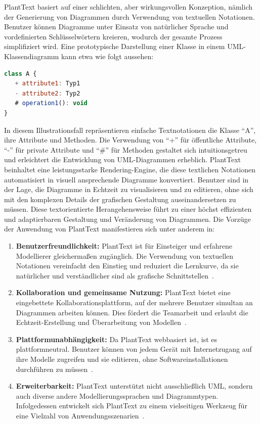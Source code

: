 PlantText basiert auf einer schlichten, aber wirkungsvollen Konzeption, nämlich der Generierung von Diagrammen durch
Verwendung von textuellen Notationen. Benutzer können Diagramme unter Einsatz von natürlicher Sprache und vordefinierten
Schlüsselwörtern kreieren, wodurch der gesamte Prozess simplifiziert wird. Eine prototypische Darstellung einer Klasse
in einem UML-Klassendiagramm kann etwa wie folgt aussehen:


\begin{lstlisting}[caption={[Codebeispiel] PlantText code Example}, label={lst:Planttext}, float=!ht, language=javascript]
class A {
   + attribute1: Typ1
   - attribute2: Typ2
   # operation1(): void
}
\end{lstlisting}

In diesem Illustrationsfall repräsentieren einfache Textnotationen die Klasse ``A'', ihre Attribute und Methoden.
Die Verwendung von ``+'' für öffentliche Attribute, ``-'' für private Attribute und ``#'' für Methoden gestaltet sich
intuitionsgetreu und erleichtert die Entwicklung von UML-Diagrammen erheblich. PlantText beinhaltet eine leistungsstarke
Rendering-Engine, die diese textlichen Notationen automatisiert in visuell ansprechende Diagramme konvertiert. Benutzer
sind in der Lage, die Diagramme in Echtzeit zu visualisieren und zu editieren, ohne sich mit den komplexen Details der
grafischen Gestaltung auseinandersetzen zu müssen. Diese textorientierte Herangehensweise führt zu einer höchst
effizienten und adaptierbaren Gestaltung und Veränderung von Diagrammen. Die Vorzüge der Anwendung von PlantText
manifestieren sich unter anderem in:

\begin{enumerate}[itemsep=8pt, parsep=5pt]
    \item \textbf{Benutzerfreundlichkeit:} PlantText ist für Einsteiger und erfahrene Modellierer gleichermaßen zugänglich.
Die Verwendung von textuellen Notationen vereinfacht den Einstieg und reduziert die Lernkurve, da sie natürlicher und
verständlicher sind als grafische Schnittstellen~\cite{mazanec2012general}.
    \item \textbf{Kollaboration und gemeinsame Nutzung:} PlantText bietet eine eingebettete Kollaborationsplattform, auf
der mehrere Benutzer simultan an Diagrammen arbeiten können. Dies fördert die Teamarbeit und erlaubt die
Echtzeit-Erstellung und Überarbeitung von Modellen~\cite{madanayake2017transforming}.
    \item \textbf{Plattformunabhängigkeit:} Da PlantText webbasiert ist, ist es plattformneutral. Benutzer können von
jedem Gerät mit Internetzugang auf ihre Modelle zugreifen und sie editieren, ohne Softwareinstallationen durchführen
zu müssen~\cite{planttext}.
    \item \textbf{Erweiterbarkeit:} PlantText unterstützt nicht ausschließlich UML, sondern auch diverse andere
Modellierungssprachen und Diagrammtypen. Infolgedessen entwickelt sich PlantText zu einem vielseitigen Werkzeug für eine
Vielzahl von Anwendungsszenarien~\cite{planttext}.
\end{enumerate}

